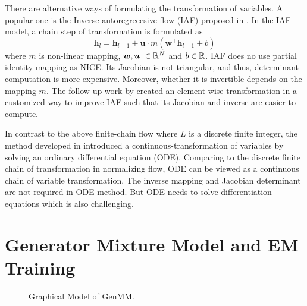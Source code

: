 \begin{remark}
  There are alternative ways of formulating the transformation of variables. A popular one is the Inverse autoregreeesive flow (IAF) proposed in \cite{rezende2015variational}. In the IAF model, a chain step of transformation is formulated as
  \begin{equation*}
    \bm{h}_l = \bm{h}_{l-1} + \bm{u} \cdot {m}(\bm{w}^{\intercal} \bm{h}_{l-1} + b)
  \end{equation*}
  where $m$ is non-linear mapping, $\bm{w}, \bm{u}~\in \mathbb{R}^{N}$ and $b\in \mathbb{R}$. IAF does no use partial identity mapping as NICE. Its Jacobian is not triangular, and thus, determinant computation is more expensive. Moreover, whether it is invertible depends on the mapping $m$. The follow-up work by \cite{kingma2016IVF} created an element-wise transformation in a customized way to improve IAF such that its Jacobian and inverse are easier to compute. 
  
  In contrast to the above finite-chain flow where $L$ is a discrete finite integer, the method developed in \cite{ricky2018ODE} introduced a continuous-transformation of variables by solving an ordinary differential equation (ODE). Comparing to the discrete finite chain of transformation in normalizing flow, ODE can be viewed as a continuous chain of variable transformation. The inverse mapping and Jacobian determinant are not required in ODE method. But ODE needs to solve differentiation equations which is also challenging.
\end{remark}

\section{Generator Mixture Model and EM Training}
\label{chpt6:sec:generator-mix-em}

\begin{figure}[t!]
  \centering
  \caption{Graphical Model of GenMM.}\label{chpt6:fig:genmm-graph}
\end{figure}


